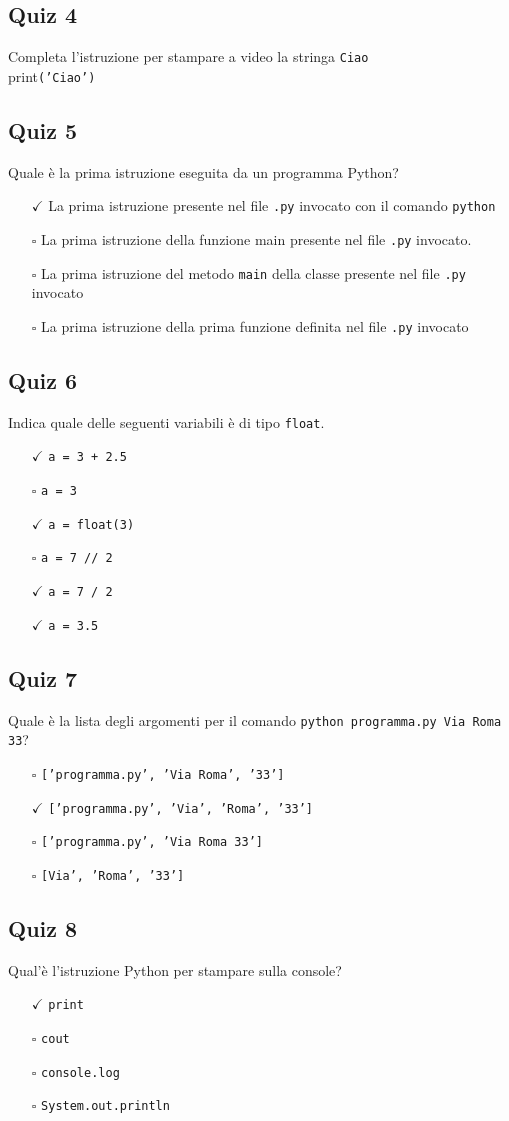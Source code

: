 \documentclass{article}
\begin{document}
\subsection*{Quiz 4}
Completa l'istruzione per stampare a video la stringa \texttt{Ciao}\\
print\texttt{('Ciao')}\subsection*{Quiz 5}
Quale è la prima istruzione eseguita da un programma Python?
\begin{itemize}
  \item[$\checkmark$] La prima istruzione presente nel file \texttt{.py} invocato con il comando \texttt{python}
  \item[$\square$] La prima istruzione della funzione main presente nel file \texttt{.py} invocato.
  \item[$\square$] La prima istruzione del metodo \texttt{main} della classe presente nel file \texttt{.py} invocato
  \item[$\square$] La prima istruzione della prima funzione definita nel file \texttt{.py} invocato
\end{itemize}
\subsection*{Quiz 6}
Indica quale delle seguenti variabili è di tipo \texttt{float}.
\begin{itemize}
  \item[$\checkmark$] \texttt{a = 3 + 2.5}
  \item[$\square$] \texttt{a = 3}
  \item[$\checkmark$] \texttt{a = float(3)}
  \item[$\square$] \texttt{a = 7 // 2}
  \item[$\checkmark$] \texttt{a = 7 / 2}
  \item[$\checkmark$] \texttt{a = 3.5}
\end{itemize}
\subsection*{Quiz 7}
Quale è la lista degli argomenti per il comando \texttt{python programma.py Via Roma 33}?
\begin{itemize}
  \item[$\square$] \texttt{['programma.py', 'Via Roma', '33']}
  \item[$\checkmark$] \texttt{['programma.py', 'Via', 'Roma', '33']}
  \item[$\square$] \texttt{['programma.py', 'Via Roma 33']}
  \item[$\square$] \texttt{[Via', 'Roma', '33']}
\end{itemize}
\subsection*{Quiz 8}
Qual'è l'istruzione Python per stampare sulla console?
\begin{itemize}
  \item[$\checkmark$] \texttt{print}
  \item[$\square$] \texttt{cout}
  \item[$\square$] \texttt{console.log}
  \item[$\square$] \texttt{System.out.println}
\end{itemize}
\end{document}
